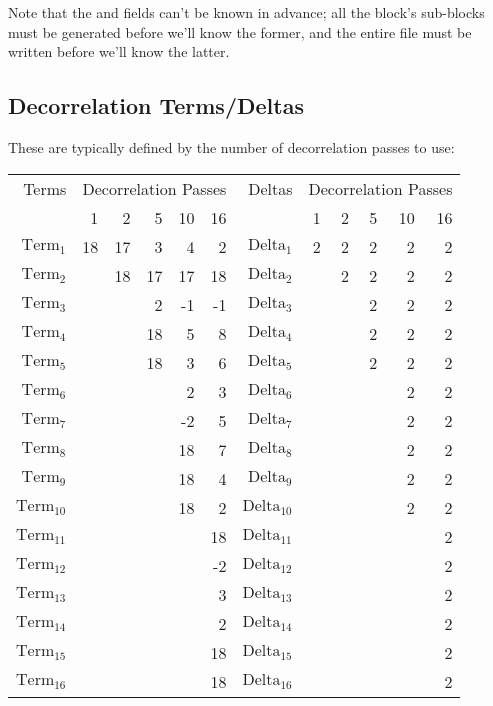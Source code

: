 Note that the  and 
fields can't be known in advance;
all the block's sub-blocks must be generated before we'll know
the former, and the entire file must be written before we'll know
the latter.

\subsection{Decorrelation Terms/Deltas}

These are typically defined by the number of decorrelation
passes to use:
\begin{table}[h]
\begin{tabular}{| r | r | r | r | r | r || r | r | r | r | r | r |}
\hline
Terms & \multicolumn{5}{c||}{Decorrelation Passes} & Deltas &
\multicolumn{5}{c|}{Decorrelation Passes} \\
& 1 & 2 & 5 & 10 & 16 & & 1 & 2 & 5 & 10 & 16 \\
\hline
$\text{Term}_1$    & 18 & 17 & 3 & 4 & 2 &
$\text{Delta}_1$   & 2  & 2  & 2 & 2 & 2 \\
$\text{Term}_2$    & & 18 & 17 & 17 & 18 &
$\text{Delta}_2$   & & 2 & 2 & 2 & 2 \\
$\text{Term}_3$    & & & 2 & -1 & -1 &
$\text{Delta}_3$   & & & 2 & 2 & 2 \\
$\text{Term}_4$    & & & 18 & 5 & 8 &
$\text{Delta}_4$   & & & 2 & 2 & 2 \\
$\text{Term}_5$    & & & 18 & 3 & 6 &
$\text{Delta}_5$   & & & 2 & 2 & 2 \\
$\text{Term}_6$    & & & & 2 & 3 &
$\text{Delta}_6$   & & & & 2 & 2 \\
$\text{Term}_7$    & & & & -2 & 5 &
$\text{Delta}_7$   & & & & 2 & 2 \\
$\text{Term}_8$    & & & & 18 & 7 &
$\text{Delta}_8$   & & & & 2 & 2 \\
$\text{Term}_9$    & & & & 18 & 4 &
$\text{Delta}_9$   & & & & 2 & 2 \\
$\text{Term}_{10}$ & & & & 18 & 2 &
$\text{Delta}_{10}$ & & & & 2 & 2 \\
$\text{Term}_{11}$ & & & & & 18 &
$\text{Delta}_{11}$ & & & & & 2 \\
$\text{Term}_{12}$ & & & & & -2 &
$\text{Delta}_{12}$ & & & & & 2 \\
$\text{Term}_{13}$ & & & & & 3 &
$\text{Delta}_{13}$ & & & & & 2 \\
$\text{Term}_{14}$ & & & & & 2 &
$\text{Delta}_{14}$ & & & & & 2 \\
$\text{Term}_{15}$ & & & & & 18 &
$\text{Delta}_{15}$ & & & & & 2 \\
$\text{Term}_{16}$ & & & & & 18 &
$\text{Delta}_{16}$ & & & & & 2 \\
\hline
\end{tabular}
\end{table}
